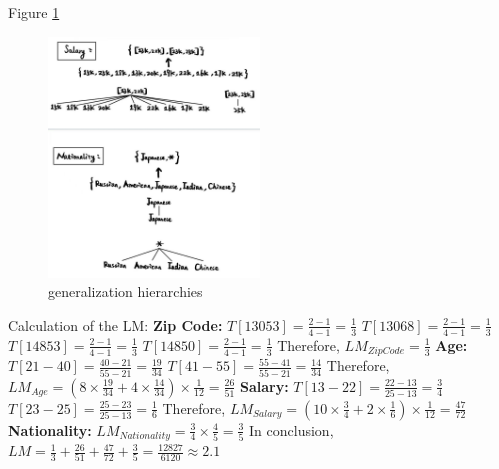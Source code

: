 \documentclass[12pt]{article}
\begin{document}
Figure \ref{fig:2}
\begin{figure}[htbp]
    \centering
    \includegraphics[width = 0.5\textwidth]{pics/pic2.jpg}
    \caption{generalization hierarchies}
    \label{fig:2}
\end{figure}
\newpage
Calculation of the LM:
\newline
\textbf{Zip Code:}
\newline
$T[13053]=\frac{2-1}{4-1}=\frac{1}{3}$
\newline
$T[13068]=\frac{2-1}{4-1}=\frac{1}{3}$
\newline
$T[14853]=\frac{2-1}{4-1}=\frac{1}{3}$
\newline
$T[14850]=\frac{2-1}{4-1}=\frac{1}{3}$
\newline
Therefore, $LM_{Zip Code}=\frac{1}{3}$
\newline
\textbf{Age:}
\newline
$T[21-40]=\frac{40-21}{55-21}=\frac{19}{34}$
\newline
$T[41-55]=\frac{55-41}{55-21}=\frac{14}{34}$
\newline
Therefore, $LM_{Age}=(8\times \frac{19}{34}+4\times \frac{14}{34})\times \frac{1}{12}=\frac{26}{51}$
\newline
\textbf{Salary:}
\newline
$T[13-22]=\frac{22-13}{25-13}=\frac{3}{4}$
\newline
$T[23-25]=\frac{25-23}{25-13}=\frac{1}{6}$
\newline
Therefore, $LM_{Salary}=(10\times \frac{3}{4}+2\times \frac{1}{6})\times \frac{1}{12}=\frac{47}{72}$
\newline
\textbf{Nationality:}
\newline
$LM_{Nationality}=\frac{3}{4}\times \frac{4}{5}=\frac{3}{5}$
\newline
In conclusion, $LM=\frac{1}{3}+\frac{26}{51}+\frac{47}{72}+\frac{3}{5}=\frac{12827}{6120}\approx2.1$
\end{document}
